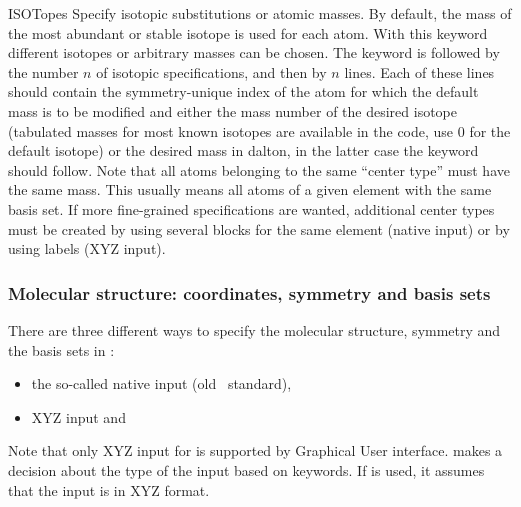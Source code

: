 \begin{keywordlist}
\item[ISOTopes]
Specify isotopic substitutions or atomic masses. By default, the mass of the most
abundant or stable isotope is used for each atom. With this keyword different
isotopes or arbitrary masses can be chosen. The keyword is followed by the number
$n$ of isotopic specifications, and then by $n$ lines. Each of these
lines should contain the symmetry-unique index of the atom for which the default
mass is to be modified and either the mass number of the desired isotope (tabulated
masses for most known isotopes are available in the code, use 0 for the default
isotope) or the desired mass in dalton, in the latter case the keyword 
should follow. Note that all atoms belonging to the same ``center type'' must have the
same mass. This usually means all atoms of a given element with the same basis set.
If more fine-grained specifications are wanted, additional center types must be
created by using several  blocks for the same element (native
input) or by using labels (XYZ input).

\end{keywordlist}


\subsubsection{Molecular structure: coordinates, symmetry and basis sets}
There are three different ways to specify the molecular structure, symmetry and
the basis sets in :
\begin{itemize}
\item
the so-called native input (old \molcas\ standard),
\item
XYZ input and
\end{itemize}
Note that only XYZ input for  is supported by Graphical User interface.
 makes a decision about the type of the input based on keywords.
If  is used, it assumes that the input is in XYZ format.

